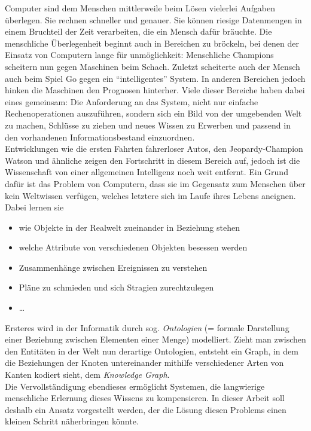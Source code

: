 \vspace{1cm}
Computer sind dem Menschen mittlerweile beim Lösen vielerlei Aufgaben überlegen. Sie rechnen schneller und genauer.
Sie können riesige Datenmengen in einem Bruchteil der Zeit verarbeiten, die ein Mensch dafür bräuchte. Die menschliche
Überlegenheit beginnt auch in Bereichen zu bröckeln, bei denen der Einsatz von Computern lange für unmöglichkeit: Menschliche
Champions scheitern nun gegen Maschinen beim Schach. Zuletzt scheiterte auch der Mensch auch beim Spiel Go gegen ein ``intelligentes'' System.
In anderen Bereichen jedoch hinken die Maschinen den Prognosen hinterher. Viele dieser Bereiche haben dabei eines gemeinsam:
Die Anforderung an das System, nicht nur einfache Rechenoperationen auszuführen, sondern sich ein Bild von der umgebenden Welt zu machen,
Schlüsse zu ziehen und neues Wissen zu Erwerben und passend in den vorhandenen Informationsbestand einzuordnen.\\
Entwicklungen wie die ersten Fahrten fahrerloser Autos, den Jeopardy-Champion Watson und ähnliche zeigen den Fortschritt in diesem Bereich auf,
jedoch ist die Wissenschaft von einer allgemeinen Intelligenz noch weit entfernt. Ein Grund dafür ist das Problem von Computern,
dass sie im Gegensatz zum Menschen über kein Weltwissen verfügen, welches letztere sich im Laufe ihres Lebens aneignen.
Dabei lernen sie
\begin{itemize}
  \item wie Objekte in der Realwelt zueinander in Beziehung stehen
  \item welche Attribute von verschiedenen Objekten besessen werden
  \item Zusammenhänge zwischen Ereignissen zu verstehen
  \item Pläne zu schmieden und sich Stragien zurechtzulegen
  \item \ldots
\end{itemize}

Ersteres wird in der Informatik durch sog. \emph{Ontologien} (= formale Darstellung einer Beziehung zwischen Elementen einer Menge)
modelliert. Zieht man zwischen den Entitäten in der Welt nun derartige Ontologien, entsteht ein Graph, in dem die Beziehungen
der Knoten untereinander mithilfe verschiedener Arten von Kanten kodiert sieht, dem \emph{Knowledge Graph}.\\
Die Vervollständigung ebendieses ermöglicht Systemen, die langwierige menschliche Erlernung dieses Wissens zu kompensieren.
In dieser Arbeit soll deshalb ein Ansatz vorgestellt werden, der die Lösung diesen Problems einen kleinen Schritt näherbringen könnte.


